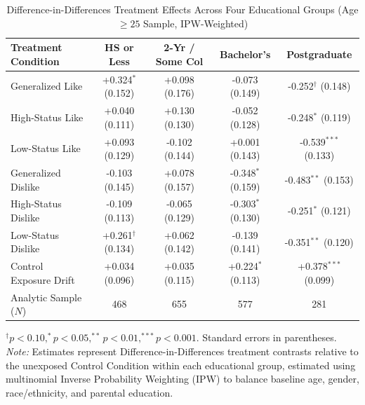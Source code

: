 \begin{table}[ht!]
\centering
\small
\caption{Difference-in-Differences Treatment Effects Across Four Educational Groups (Age $\ge 25$ Sample, IPW-Weighted)}
\label{tbl:did_edu_4tiers}
\setlength{\tabcolsep}{2.5pt}
\begin{tabular*}{\linewidth}{@{\extracolsep{\fill}}lcccc@{}}
\toprule
\textbf{Treatment Condition} & \textbf{HS or Less} & \textbf{2-Yr / Some Col} & \textbf{Bachelor's} & \textbf{Postgraduate} \\
\midrule
Generalized Like & +0.324$^{*}$ (0.152) & +0.098 (0.176) & -0.073 (0.149) & -0.252$^{\dagger}$ (0.148) \\
High-Status Like & +0.040 (0.111) & +0.130 (0.130) & -0.052 (0.128) & -0.248$^{*}$ (0.119) \\
Low-Status Like & +0.093 (0.129) & -0.102 (0.144) & +0.001 (0.143) & -0.539$^{***}$ (0.133) \\
Generalized Dislike & -0.103 (0.145) & +0.078 (0.157) & -0.348$^{*}$ (0.159) & -0.483$^{**}$ (0.153) \\
High-Status Dislike & -0.109 (0.113) & -0.065 (0.129) & -0.303$^{*}$ (0.130) & -0.251$^{*}$ (0.121) \\
Low-Status Dislike & +0.261$^{\dagger}$ (0.134) & +0.062 (0.142) & -0.139 (0.141) & -0.351$^{**}$ (0.120) \\
\midrule
Control Exposure Drift & +0.034 (0.096) & +0.035 (0.115) & +0.224$^{*}$ (0.113) & +0.378$^{***}$ (0.099) \\
Analytic Sample ($N$) & 468 & 655 & 577 & 281 \\
\bottomrule
\end{tabular*}
\begin{minipage}{\linewidth}
\vspace{4pt}
\footnotesize
$^{\dagger}p < 0.10, ^{*}p < 0.05, ^{**}p < 0.01, ^{***}p < 0.001$. Standard errors in parentheses. \newline \textit{Note:} Estimates represent Difference-in-Differences treatment contrasts relative to the unexposed Control Condition within each educational group, estimated using multinomial Inverse Probability Weighting (IPW) to balance baseline age, gender, race/ethnicity, and parental education.
\end{minipage}
\end{table}
